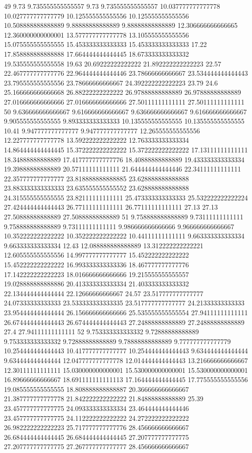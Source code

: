 49 9.73 9.735555555555557 9.73 9.735555555555557 10.037777777777778 10.027777777777779 10.125555555555556 10.125555555555556 10.508888888888889 9.88888888888889 9.88888888888889 12.306666666666665 12.360000000000001 13.577777777777778 13.105555555555556 15.075555555555555 15.453333333333333 15.453333333333333 17.22 17.858888888888888 17.664444444444445 18.673333333333332 19.535555555555558 19.63 20.69222222222222 21.892222222222223 22.57 22.467777777777776 22.964444444444446 23.78666666666667 23.534444444444443 23.795555555555556 23.78666666666667 24.392222222222223 23.79 24.6 25.166666666666668 26.88222222222222 26.97888888888889 26.97888888888889 27.016666666666666 27.016666666666666 27.50111111111111 27.50111111111111
50 9.636666666666667 9.616666666666667 9.636666666666667 9.616666666666667 9.905555555555555 9.893333333333333 10.135555555555555 10.135555555555555 10.41 9.947777777777777 9.947777777777777 12.265555555555556 12.227777777777778 13.592222222222222 12.763333333333334 14.864444444444445 15.372222222222222 15.372222222222222 17.13111111111111 18.34888888888889 17.417777777777776 18.40888888888889 19.433333333333334 19.39888888888889 20.57111111111111 21.644444444444446 22.34111111111111 22.357777777777777 23.818888888888885 23.628888888888888 23.883333333333333 23.635555555555552 23.628888888888888 24.315555555555555 23.82111111111111 25.473333333333333 25.532222222222224 27.424444444444443 26.77111111111111 26.77111111111111 27.13 27.13 27.50888888888889 27.50888888888889
51 9.758888888888889 9.73111111111111 9.758888888888889 9.73111111111111 9.986666666666666 9.966666666666667 10.352222222222222 10.352222222222222 10.44111111111111 9.663333333333334 9.663333333333334 12.43 12.088888888888889 13.312222222222221 12.605555555555556 14.997777777777777 15.452222222222222 15.452222222222222 16.993333333333336 18.467777777777776 17.142222222222223 18.016666666666666 19.215555555555557 19.028888888888886 20.413333333333334 21.403333333333332 22.134444444444444 22.12666666666667 24.57 23.517777777777777 24.07333333333333 23.533333333333335 23.517777777777777 24.21333333333333 23.954444444444444 26.156666666666666 25.535555555555554 27.94111111111111 26.674444444444443 26.674444444444443 27.24888888888889 27.24888888888889 27.4 27.94111111111111
52 9.753333333333332 9.72888888888889 9.753333333333332 9.72888888888889 9.78888888888889 9.777777777777779 10.254444444444443 10.417777777777777 10.254444444444443 9.634444444444444 9.634444444444444 12.047777777777778 12.014444444444443 13.216666666666667 12.30111111111111 15.030000000000001 15.530000000000001 15.530000000000001 16.89666666666667 18.691111111111113 17.164444444444445 17.775555555555556 19.085555555555555 18.808888888888887 20.366666666666667 21.387777777777778 21.842222222222222 21.84888888888889 25.39 23.457777777777775 24.093333333333334 23.464444444444446 23.457777777777775 24.112222222222222 24.272222222222222 26.982222222222223 25.717777777777776 28.456666666666667 26.684444444444445 26.684444444444445 27.207777777777775 27.207777777777775 27.267777777777777 28.456666666666667
